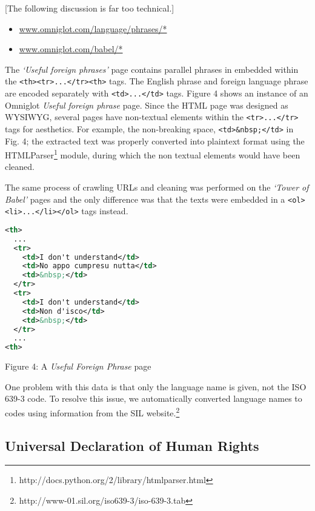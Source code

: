 \documentclass[11pt]{article}
\begin{document}
[The following discussion is far too technical.]

\begin{itemize}[noitemsep]
\item \url{www.omniglot.com/language/phrases/*} 
\item \url{www.omniglot.com/babel/*}
\end{itemize}

\noindent The \emph{`Useful foreign phrases'} page contains parallel phrases in embedded within the \texttt{<th><tr>...</tr><th>} tags. The English phrase and foreign language phrase are encoded separately with \texttt{<td>...</td>} tags. Figure 4 shows an instance of an Omniglot \emph{Useful foreign phrase} page. Since the HTML page was designed as WYSIWYG, several pages have non-textual elements within the \texttt{<tr>...</tr>} tags for aesthetics. For example, the non-breaking space, \texttt{<td>\&nbsp;</td>} in Fig. 4; the extracted text was properly converted into plaintext format using the HTMLParser\footnote{http://docs.python.org/2/library/htmlparser.html} module, during which the non textual elements would have been cleaned. 

The same process of crawling URLs and cleaning was performed on the \emph{`Tower of Babel'} pages and the only difference was that the texts were embedded in a \texttt{<ol><li>...</li></ol>} tags instead.

\begin{minipage}{\columnwidth}
\begin{lstlisting}[language=XML]
<th>
  ...
  <tr>
    <td>I don't understand</td>
    <td>No appo cumpresu nutta</td>
    <td>&nbsp;</td>
  </tr>
  <tr>
    <td>I don't understand</td>
    <td>Non d'isco</td>
    <td>&nbsp;</td>
  </tr>
  ...
<th>
\end{lstlisting} 
\centerline{Figure 4: A \emph{Useful Foreign Phrase} page}
\end{minipage}
\smallskip

\noindent One problem with this data is that only the language name is given, not the ISO 639-3 code. To resolve this issue, we automatically converted language names to codes using information from the SIL website.\footnote{http://www-01.sil.org/iso639-3/iso-639-3.tab}

\subsection{Universal Declaration of Human Rights}
\end{document}
